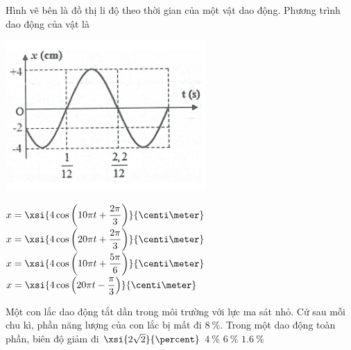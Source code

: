 \begin{ex}
	Hình vẽ bên là đồ thị li độ theo thời gian của một vật dao động. Phương trình dao động của vật là
	\begin{center}
		\includegraphics[width=0.4\linewidth]{../figs/C1-Q-5}
	\end{center}
	\choice
	{\True $x=\xsi{4\cos\left(10\pi t+\dfrac{2\pi}{3}\right)}{\centi\meter}$}
	{$x=\xsi{4\cos\left(20\pi t+\dfrac{2\pi}{3}\right)}{\centi\meter}$}
	{$x=\xsi{4\cos\left(10\pi t+\dfrac{5\pi}{6}\right)}{\centi\meter}$}
	{$x=\xsi{4\cos\left(20\pi t-\dfrac{\pi}{3}\right)}{\centi\meter}$}
\end{ex}
\begin{ex}
	Một con lắc dao động tắt dần trong môi trường với lực ma sát nhỏ. Cứ sau mỗi chu kì, phần năng lượng của con lắc bị mất đi $\SI{8}{\percent}$. Trong một dao động toàn phần, biên độ giảm đi
	\choice
	{$\xsi{2\sqrt{2}}{\percent}$}
	{\True $\SI{4}{\percent}$}
	{$\SI{6}{\percent}$}
	{$\SI{1.6}{\percent}$}
\end{ex}
